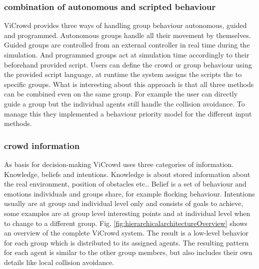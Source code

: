 \documentclass{acmsiggraph}               %
\begin{document}
\subsubsection{combination of autonomous and scripted behaviour}
ViCrowd provides three ways of handling group behaviour autonomous, guided and programmed. 
Autonomous groups handle all their movement by themselves. Guided groups are controlled from an external controller in real time during the simulation. And programmed groups act at simulation time accordingly to their beforehand provided script. Users can define the crowd or group behaviour using the provided script language, at runtime the system assigns the scripts the to specific groups. 
What is interesting about this approach is that all three methods can be combined even on the same group. For example the user can directly guide a group but the individual agents still handle the collision avoidance. To manage this they implemented a behaviour priority model for the different input methods.
\subsubsection{crowd information}
As basis for decision-making ViCrowd uses three categories of information. Knowledge, beliefs and intentions. 
Knowledge is about stored information about the real environment, position of obstacles etc.. 
Belief is a set of behaviour and emotions individuals and groups share, for example flocking behaviour.
Intentions usually are at group and individual level only and consists of goals to achieve, some examples are at group level interesting points and at individual level when to change to a different group.
Fig. \ref{fig:hierarchicalarchitectureOverview} shows an overview of the complete ViCrowd system. The result is a low-level behavior for each group which is distributed to its assigned agents. The resulting pattern for each agent is similar to the other group members, but also includes their own details like local collision avoidance.
\end{document}
